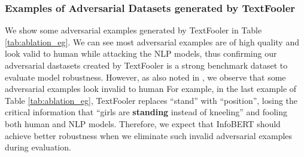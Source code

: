 \documentclass{article} \usepackage{iclr2021_conference,times}
\theoremstyle{definition}
\theoremstyle{remark}
\newcommand{\method}{InfoBERT\xspace}
\begin{document}
\subsubsection{Examples of Adversarial Datasets generated by TextFooler} We show some adversarial examples generated by TextFooler in Table \ref{tab:ablation_eg}. We can see most adversarial examples are of high quality and look valid to human while attacking the NLP models, thus confirming our adversarial dastasets created by TextFooler is a strong benchmark dataset to evaluate model robustness. However, as also noted in \citet{textfooler}, we observe that some adversarial examples look invalid to human For example, in the last example of Table \ref{tab:ablation_eg}, TextFooler replaces ``stand'' with ``position'', losing the critical information that ``girls are \textbf{standing} instead of kneeling'' and fooling both human and NLP models. Therefore, we expect that \method should achieve better robustness when we eliminate such invalid adversarial examples during evaluation.
\end{document}
